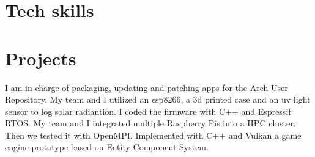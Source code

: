 \documentclass[10pt, a4paper]{moderncv}
\begin{document}
\section{Tech skills}

\section{Projects}
{
	I am in charge of packaging, updating and patching apps for the Arch User Repository.
}
{
	My team and I utilized an esp8266, a 3d printed case and an uv light sensor to log solar radiantion. I coded the firmware with C++ and Espressif RTOS.
}
{
	My team and I integrated multiple Raspberry Pis into a HPC cluster.
	Then we tested it with OpenMPI.
}
{
	Implemented with C++ and Vulkan a game engine prototype based on Entity Component System.
}


\end{document}
